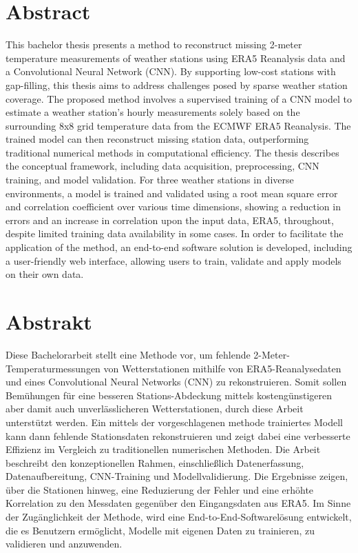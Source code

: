 \section*{Abstract}
\label{sec: abstract}

This bachelor thesis presents a method to reconstruct missing 2-meter temperature measurements of weather stations using ERA5 Reanalysis data and a Convolutional Neural Network (CNN).
By supporting low-cost stations with gap-filling, this thesis aims to address challenges posed by sparse weather station coverage.
The proposed method involves a supervised training of a CNN model to estimate a weather station's hourly measurements solely based on the surrounding 8x8 grid temperature data from the ECMWF ERA5 Reanalysis.
The trained model can then reconstruct missing station data, outperforming traditional numerical methods in computational efficiency.
The thesis describes the conceptual framework, including data acquisition, preprocessing, CNN training, and model validation.
For three weather stations in diverse environments, a model is trained and validated using a root mean square error and correlation coefficient over various time dimensions, showing a reduction in errors and an increase in correlation upon the input data, ERA5, throughout, despite limited training data availability in some cases.
In order to facilitate the application of the method, an end-to-end software solution is developed, including a user-friendly web interface, allowing users to train, validate and apply models on their own data.

\section*{Abstrakt}

Diese Bachelorarbeit stellt eine Methode vor, um fehlende 2-Meter-Temperaturmessungen von Wetterstationen mithilfe von ERA5-Reanalysedaten und eines Convolutional Neural Networks (CNN) zu rekonstruieren.
Somit sollen Bemühungen für eine besseren Stations-Abdeckung mittels kostengünstigeren aber damit auch unverlässlicheren Wetterstationen, durch diese Arbeit unterstützt werden.
Ein mittels der vorgeschlagenen methode trainiertes Modell kann dann fehlende Stationsdaten rekonstruieren und zeigt dabei eine verbesserte Effizienz im Vergleich zu traditionellen numerischen Methoden.
Die Arbeit beschreibt den konzeptionellen Rahmen, einschließlich Datenerfassung, Datenaufbereitung, CNN-Training und Modellvalidierung.
Die Ergebnisse zeigen, über die Stationen hinweg, eine Reduzierung der Fehler und eine erhöhte Korrelation zu den Messdaten gegenüber den Eingangsdaten aus ERA5. Im Sinne der Zugänglichkeit der Methode, wird eine End-to-End-Softwarelösung entwickelt, die es Benutzern ermöglicht, Modelle mit eigenen Daten zu trainieren, zu validieren und anzuwenden.